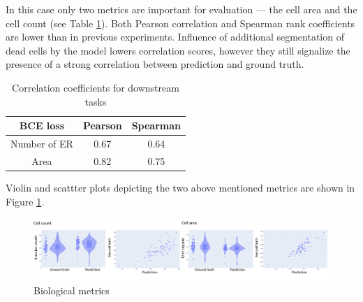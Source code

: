 In this case only two metrics are important for evaluation --- the cell area and the cell count (see Table \ref{table:gfp-metrics}). Both Pearson correlation and Spearman rank coefficients are lower than in previous experiments. Influence of additional segmentation of dead cells by the model lowers correlation scores, however they still signalize the presence of a strong correlation between prediction and ground truth. 
\begin{table}[H]
    \centering
    \caption{Correlation coefficients for downstream tasks}
        \begin{adjustbox}{width=0.4\textwidth}
            \begin{tabular}{|c|c|c|}\hline
                BCE loss&Pearson&Spearman
                \\\hline\hline
                Number of ER&0.67&0.64\\\hline
                Area&0.82&0.75\\\hline
            \end{tabular}
            \label{table:gfp-metrics}
        \end{adjustbox}
\end{table}

Violin and scattter plots depicting the two above mentioned metrics are shown in Figure \ref{fig:gfp-bce-metrics}.
\begin{figure}[H]
	\begin{center}
		\includegraphics[width=\linewidth]{bilder/gfp/binary-bce/gfp-bce-metrics.png}
		\caption{Biological metrics}\label{fig:gfp-bce-metrics}
	\end{center}
\end{figure}